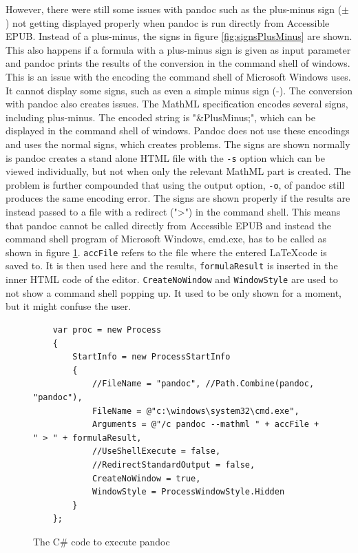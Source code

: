 However, there were still some issues with pandoc such as the plus-minus sign ($\pm$) not getting displayed properly when pandoc is run directly from Accessible EPUB. Instead of a plus-minus, the signs 
in figure \ref{fig:signsPlusMinus} are shown. This also happens if a formula with a plus-minus sign is given as input parameter and pandoc prints the results of the conversion in the command shell of windows. This is an issue with the encoding the command shell of Microsoft Windows uses. It cannot display some signs, such as even a simple minus sign (-). The conversion with pandoc also creates issues. The MathML specification \cite{mathMLrec} encodes several signs, including plus-minus. The encoded string is "\&PlusMinus;", which can be displayed in the command shell of windows. Pandoc does not use these encodings and uses the normal signs, which creates problems. The signs are shown normally is pandoc creates a stand alone HTML file with the \lstinline|-s| option which can be viewed individually, but not when only the relevant MathML part is created. The problem is further compounded that using the output option, \lstinline|-o|, of pandoc still produces the same encoding error. The signs are shown properly if the results are instead passed to a file with a redirect (">") in the command shell. This means that pandoc cannot be called directly from Accessible EPUB and instead the command shell program of Microsoft Windows, cmd.exe, has to be called as shown in figure \ref{fig:execPandoc}. \lstinline|accFile| refers to the file where the entered \LaTeX code is saved to. It is then used here and the results, \lstinline|formulaResult| is inserted in the inner HTML code of the editor. \lstinline|CreateNoWindow| and \lstinline|WindowStyle| are used to not show a command shell popping up. It used to be only shown for a moment, but it might confuse the user.

\begin{figure}[h]
	
	\begin{lstlisting}
	var proc = new Process
	{
		StartInfo = new ProcessStartInfo
		{
			//FileName = "pandoc", //Path.Combine(pandoc, "pandoc"),
			FileName = @"c:\windows\system32\cmd.exe",
			Arguments = @"/c pandoc --mathml " + accFile + " > " + formulaResult,
			//UseShellExecute = false,
			//RedirectStandardOutput = false,
			CreateNoWindow = true,
			WindowStyle = ProcessWindowStyle.Hidden
		}
	}; 
	\end{lstlisting}
	\caption{The C\# code to execute pandoc}
	\label{fig:execPandoc}
\end{figure}

